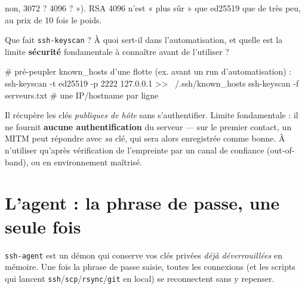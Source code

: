 \documentclass[a4paper,10pt]{exam}
\begin{document}
\begin{questions}
\begin{solution}
non, 3072 ? 4096 ? »). RSA 4096 n'est « plus sûr » que ed25519 que de très peu, au prix
de 10 fois le poids.
\end{solution}
\question Que fait \texttt{ssh-keyscan} ? À quoi sert-il dans l'automatisation, et quelle
est la limite \textbf{sécurité} fondamentale à connaître avant de l'utiliser ?
\begin{solution}
\begin{bashcode}
# pré-peupler known_hosts d'une flotte (ex. avant un run d'automatisation) :
ssh-keyscan -t ed25519 -p 2222 127.0.0.1 >> ~/.ssh/known_hosts
ssh-keyscan -f serveurs.txt          # une IP/hostname par ligne
\end{bashcode}
Il récupère les clés \emph{publiques de hôte} sans s'authentifier. Limite fondamentale :
il ne fournit \textbf{aucune authentification} du serveur — sur le premier contact, un
MITM peut répondre avec \emph{sa} clé, qui sera alors enregistrée comme bonne.
À n'utiliser qu'après vérification de l'empreinte par un canal de confiance
(out-of-band), ou en environnement maîtrisé.
\end{solution}
\end{questions}

\section{L'agent : la phrase de passe, une seule fois}

\texttt{ssh-agent} est un démon qui conserve vos clés privées \emph{déjà déverrouillées} en
mémoire. Une fois la phrase de passe saisie, toutes les connexions (et les scripts qui
lancent \texttt{ssh}/\texttt{scp}/\texttt{rsync}/\texttt{git} en local) se reconnectent sans
y repenser.
\end{document}
